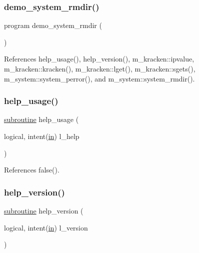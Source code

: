 \subsubsection{\texorpdfstring{demo\+\_\+system\+\_\+rmdir()}{demo\_system\_rmdir()}}
{\footnotesize\ttfamily program demo\+\_\+system\+\_\+rmdir (\begin{DoxyParamCaption}{ }\end{DoxyParamCaption})}



References help\+\_\+usage(), help\+\_\+version(), m\+\_\+kracken\+::ipvalue, m\+\_\+kracken\+::kracken(), m\+\_\+kracken\+::lget(), m\+\_\+kracken\+::sgets(), m\+\_\+system\+::system\+\_\+perror(), and m\+\_\+system\+::system\+\_\+rmdir().

\mbox{\label{__rmdir_8f90_a3e09a3b52ee8fb04eeb93fe5761626a8}} 
\subsubsection{\texorpdfstring{help\+\_\+usage()}{help\_usage()}}
{\footnotesize\ttfamily \hyperlink{M__stopwatch_83_8txt_acfbcff50169d691ff02d4a123ed70482}{subroutine} help\+\_\+usage (\begin{DoxyParamCaption}\item[{logical, intent(\hyperlink{M__journal_83_8txt_afce72651d1eed785a2132bee863b2f38}{in})}]{l\+\_\+help }\end{DoxyParamCaption})}



References false().

\mbox{\label{__rmdir_8f90_a39c21619b08a3c22f19e2306efd7f766}} 
\subsubsection{\texorpdfstring{help\+\_\+version()}{help\_version()}}
{\footnotesize\ttfamily \hyperlink{M__stopwatch_83_8txt_acfbcff50169d691ff02d4a123ed70482}{subroutine} help\+\_\+version (\begin{DoxyParamCaption}\item[{logical, intent(\hyperlink{M__journal_83_8txt_afce72651d1eed785a2132bee863b2f38}{in})}]{l\+\_\+version }\end{DoxyParamCaption})}



